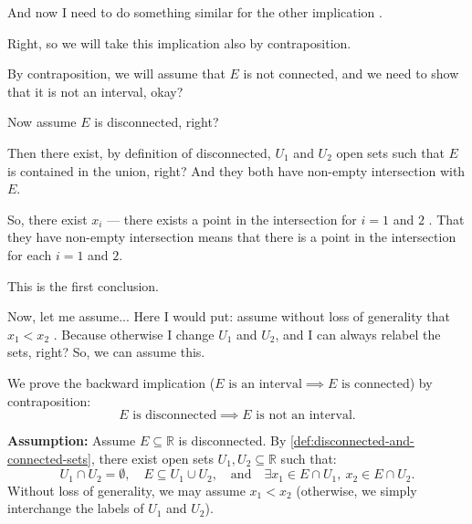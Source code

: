 \begin{proofWrapper}
\begin{speech}[00:09:30 - 00:11:35]
And now I need to do something similar for the other implication .

Right, so we will take this implication also by contraposition.

By contraposition, we will assume that $E$ is not connected, and we need to show that it is not an interval, okay?

Now assume $E$ is disconnected, right? 

Then there exist, by definition of disconnected, $U_1$ and $U_2$ open sets  such that $E$ is contained in the union, right? And they both have non-empty intersection with $E$.

So, there exist $x_i$ --- there exists a point in the intersection for $i = 1$ and $2$ . That they have non-empty intersection means that there is a point in the intersection for each $i = 1$ and $2$.

This is the first conclusion.

Now, let me assume... Here I would put: assume without loss of generality that $x_1 < x_2$ . Because otherwise I change $U_1$ and $U_2$, and I can always relabel the sets, right? So, we can assume this.
\end{speech}

\begin{content}
We prove the backward implication ($E \text{ is an interval} \implies E \text{ is connected}$) by contraposition:
\[
E \text{ is disconnected} \implies E \text{ is not an interval}.
\]

\textbf{Assumption:}
Assume $E \subseteq \mathbb{R}$ is disconnected. By \cref{def:disconnected-and-connected-sets}, there exist open sets $U_1, U_2 \subseteq \mathbb{R}$ such that:
\begin{equation}\label{eq:backward-hypo}
U_1 \cap U_2 = \emptyset, \quad E \subseteq U_1 \cup U_2, \quad \text{and} \quad \exists x_1 \in E \cap U_1, \ x_2 \in E \cap U_2.
\end{equation}
Without loss of generality, we may assume $x_1 < x_2$ (otherwise, we simply interchange the labels of $U_1$ and $U_2$).
\end{content}


\end{proofWrapper}
